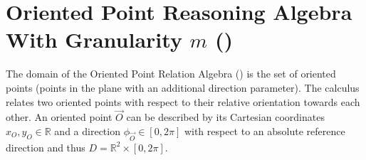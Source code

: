 
\section{Oriented Point Reasoning Algebra With Granularity $m$ (\opra)}\label{sec:opra}


The domain of the Oriented Point Relation Algebra (\OPRAm{}) \citep{Moratz_Dylla_Frommberger_05_adjustable_Granularity,moratz06_opra} is the set of oriented points (points in the plane with an
additional direction parameter). The calculus relates two  oriented points
with respect to their relative orientation towards each other.
An oriented point
$\vec{O}$ can be described by its Cartesian coordinates $x_O, y_O \in {\mathbb{R}}$ and a direction $\phi_{\vec{O}} \in [0,2\pi]$ with respect to an absolute
reference direction and thus $D={\mathbb{R}}^2 \times [0,2\pi]$.

